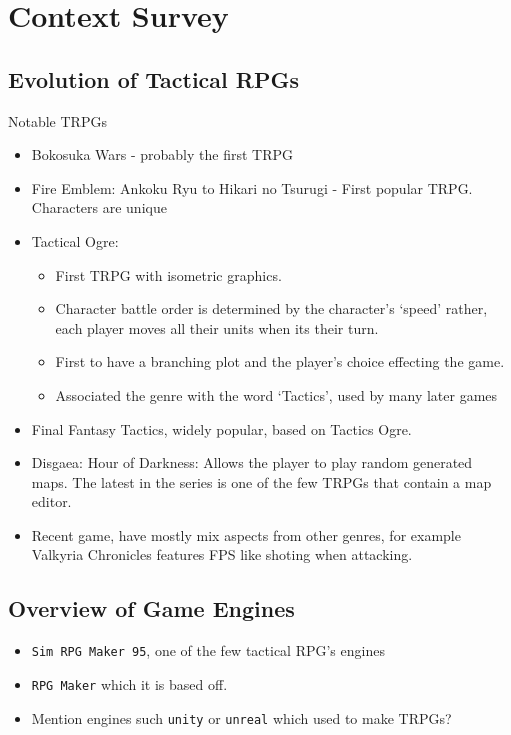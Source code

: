 \section{Context Survey} 
\label{Context_Survey}

\subsection{Evolution of Tactical RPGs } %
\label{sub:evolution_of_tactical_rpgs_}

Notable TRPGs
\begin{itemize}
	\item Bokosuka Wars  - probably the first TRPG
	\item Fire Emblem: Ankoku Ryu to Hikari no Tsurugi  -  First popular TRPG.  Characters are unique
	\item Tactical Ogre:  
	\begin{itemize}
		\item  First TRPG with isometric graphics.
		\item Character battle order is determined by the character's `speed' rather, each player moves all their units when its their turn.
		\item  First to have a branching plot and the player's choice effecting the game.
		\item  Associated the genre with the word `Tactics', used by many later games
	\end{itemize}      
	\item Final Fantasy Tactics, widely popular, based on Tactics Ogre.
	\item Disgaea: Hour of Darkness:  Allows the player to play random generated maps. The latest in the series is one of the few TRPGs that contain a map editor.  
	\item Recent game, have mostly mix aspects from other genres, for example Valkyria Chronicles features FPS like shoting when attacking.
\end{itemize}


\subsection{Overview of Game Engines} %
\label{sub:overview_of_game_engines}

\begin{itemize}
	\item \texttt{Sim RPG Maker 95}, one of the few tactical RPG's engines
	\item \texttt{RPG Maker} which it is based off. 
	\item Mention  engines such \texttt{unity} or \texttt{unreal}  which used to make TRPGs?  
\end{itemize}

